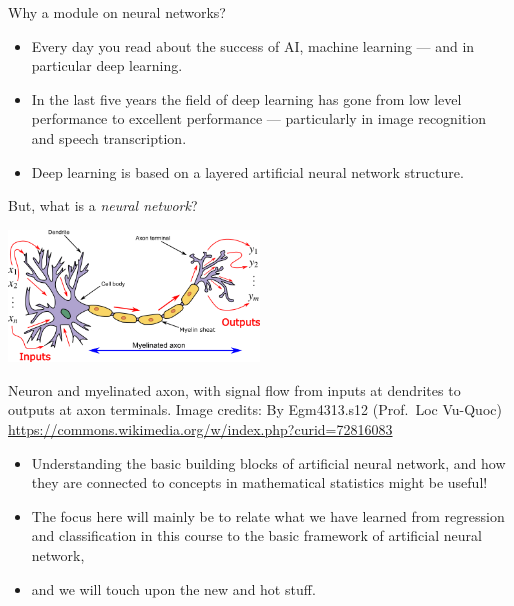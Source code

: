 \documentclass[10pt,ignorenonframetext,]{beamer}
\providecommand{\tightlist}{%
  \setlength{\itemsep}{0pt}\setlength{\parskip}{0pt}}
\begin{document}
\begin{frame}

\begin{block}{Why a module on neural networks?}

\begin{itemize}
\tightlist
\item
  Every day you read about the success of AI, machine learning --- and
  in particular deep learning.
\item
  In the last five years the field of deep learning has gone from low
  level performance to excellent performance --- particularly in image
  recognition and speech transcription.
\end{itemize}

\end{block}

\end{frame}

\begin{frame}

\begin{itemize}
\tightlist
\item
  Deep learning is based on a layered artificial neural network
  structure.
\end{itemize}

But, what is a \emph{neural network}?

\end{frame}

\begin{frame}

\centering
\includegraphics[width=0.50000\textwidth]{Neuron3.png}

Neuron and myelinated axon, with signal flow from inputs at dendrites to
outputs at axon terminals. Image credits: By Egm4313.s12 (Prof.~Loc
Vu-Quoc) \url{https://commons.wikimedia.org/w/index.php?curid=72816083}

\end{frame}

\begin{frame}

\begin{itemize}
\tightlist
\item
  Understanding the basic building blocks of artificial neural network,
  and how they are connected to concepts in mathematical statistics
  might be useful!
\item
  The focus here will mainly be to relate what we have learned from
  regression and classification in this course to the basic framework of
  artificial neural network,
\item
  and we will touch upon the new and hot stuff.
\end{itemize}

\end{frame}
\end{document}
